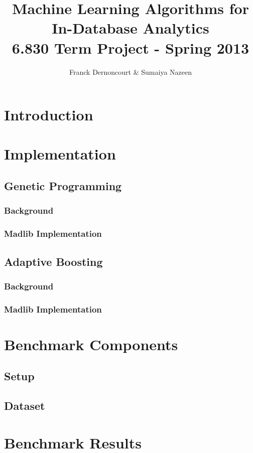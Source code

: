 \documentclass[10pt]{article}
\begin{document}
\title{Machine Learning Algorithms for In-Database Analytics \\ \small{6.830 Term Project - Spring 2013}}
\author{Franck Dernoncourt \& Sumaiya Nazeen}
\maketitle
\section{Introduction}
\section{Implementation}
\subsection{Genetic Programming}
\subsubsection{Background}
\subsubsection{Madlib Implementation}
\subsection{Adaptive Boosting}
\subsubsection{Background}
\subsubsection{Madlib Implementation}
\section{Benchmark Components}
\subsection{Setup}
\subsection{Dataset}
\section{Benchmark Results}
\end{document}
